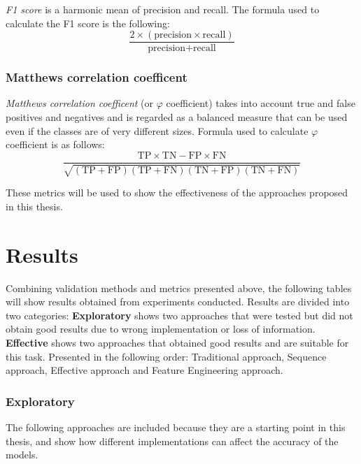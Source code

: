                 \textit{F1 score} is a harmonic mean of precision and recall. The formula used to calculate the F1 score is the following:
                \begin{equation}
                    \frac{ 2 \times (\text{precision} \times \text{recall})}{\text{precision} + \text{recall}}
                \end{equation}

            \subsubsection{Matthews correlation coefficent} 

                \textit{Matthews correlation coefficent} (or $\varphi$ coefficient) takes into account true and false positives and negatives and is regarded as a balanced measure that can be used even if the classes are of very different sizes. Formula used to calculate $\varphi$ coefficient is as follows: 
                \begin{equation}
                    \frac{\text{TP} \times \text{TN} - \text{FP} \times \text{FN}}{\sqrt{(\text{TP} + \text{FP})(\text{TP} + \text{FN})(\text{TN} + \text{FP})(\text{TN} + \text{FN})}}
                \end{equation}

            These metrics will be used to show the effectiveness of the approaches proposed in this thesis.
    
\section{Results}
        
        Combining validation methods and metrics presented above, the following tables will show results obtained from experiments conducted. Results are divided into two categories: \textbf{Exploratory} shows two approaches that were tested but did not obtain good results due to wrong implementation or loss of information. \textbf{Effective} shows two approaches that obtained good results and are suitable for this task. Presented in the following order: Traditional approach, Sequence approach, Effective approach and Feature Engineering approach. 

        \subsubsection{Exploratory}

            The following approaches are included because they are a starting point in this thesis, and show how different implementations can affect the accuracy of the models.
            
